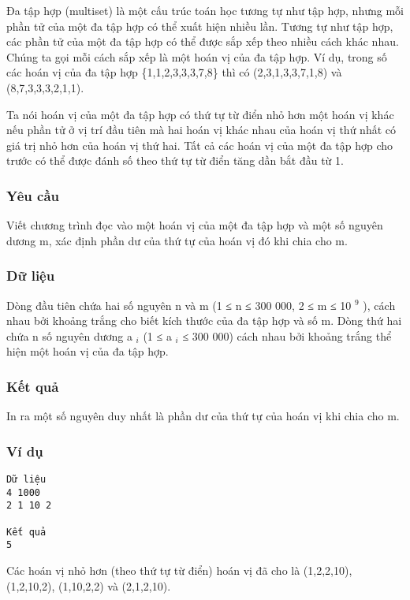 



   Đa tập hợp (multiset) là một cấu trúc toán học tương tự như tập hợp, nhưng mỗi phần tử của một đa tập hợp có thể xuất hiện nhiều lần. Tương tự như tập hợp, các phần tử của một đa tập hợp có thể được sắp xếp theo nhiều cách khác nhau. Chúng ta gọi mỗi cách sắp xếp là một hoán vị của đa tập hợp. Ví dụ, trong số các hoán vị của đa tập hợp \{1,1,2,3,3,3,7,8\} thì có (2,3,1,3,3,7,1,8) và (8,7,3,3,3,2,1,1).  

   Ta nói hoán vị của một đa tập hợp có thứ tự từ điển nhỏ hơn một hoán vị khác nếu phần tử ở vị trí đầu tiên mà hai hoán vị khác nhau của hoán vị thứ nhất có giá trị nhỏ hơn của hoán vị thứ hai. Tất cả các hoán vị của một đa tập hợp cho trước có thể được đánh số theo thứ tự từ điển tăng dần bắt đầu từ 1.  

\subsubsection{   Yêu cầu  }

   Viết chương trình đọc vào một hoán vị của một đa tập hợp và một số nguyên dương m, xác định phần dư của thứ tự của hoán vị đó khi chia cho m.  

\subsubsection{   Dữ liệu  }

   Dòng đầu tiên chứa hai số nguyên n và m (1 ≤ n ≤ 300 000, 2 ≤ m ≤ 10   $^    9   $   ), cách nhau bởi khoảng trắng cho biết kích thước của đa tập hợp và số m. Dòng thứ hai chứa n số nguyên dương a   $_    i   $   (1 ≤ a   $_    i   $   ≤ 300 000) cách nhau bởi khoảng trắng thể hiện một hoán vị của đa tập hợp.  

\subsubsection{   Kết quả  }

   In ra một số nguyên duy nhất là phần dư của thứ tự của hoán vị khi chia cho m.  

\subsubsection{   Ví dụ  }
\begin{verbatim}
Dữ liệu
4 1000 
2 1 10 2 

Kết quả
5
\end{verbatim}

   Các hoán vị nhỏ hơn (theo thứ tự từ điển) hoán vị đã cho là (1,2,2,10), (1,2,10,2), (1,10,2,2) và (2,1,2,10).  